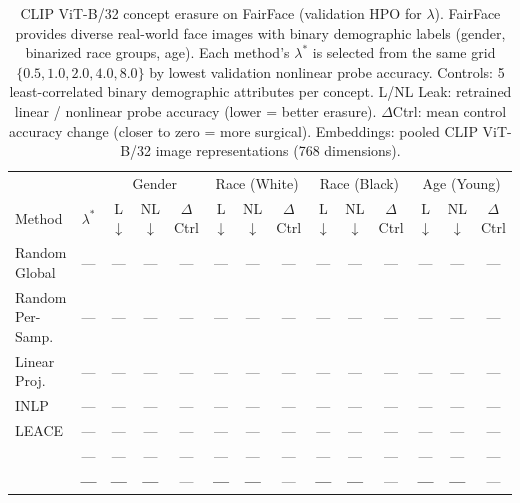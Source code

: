 \begin{table}[t]
\centering
\caption{CLIP ViT-B/32 concept erasure on FairFace (validation HPO for $\lambda$). FairFace provides diverse real-world face images with binary demographic labels (gender, binarized race groups, age). Each method's $\lambda^*$ is selected from the same grid $\{0.5, 1.0, 2.0, 4.0, 8.0\}$ by lowest validation nonlinear probe accuracy. Controls: 5 least-correlated binary demographic attributes per concept. L/NL Leak: retrained linear / nonlinear probe accuracy (lower = better erasure). $\Delta$Ctrl: mean control accuracy change (closer to zero = more surgical). Embeddings: pooled CLIP ViT-B/32 image representations (768 dimensions).}
\label{tab:fairface_clip_fair}
\small
\setlength{\tabcolsep}{3.5pt}
\begin{tabular}{l c|ccc|ccc|ccc|ccc}
\toprule
 & & \multicolumn{3}{c|}{Gender} & \multicolumn{3}{c|}{Race (White)} & \multicolumn{3}{c|}{Race (Black)} & \multicolumn{3}{c}{Age (Young)} \\
Method & $\lambda^*$ & L$\downarrow$ & NL$\downarrow$ & $\Delta$Ctrl & L$\downarrow$ & NL$\downarrow$ & $\Delta$Ctrl & L$\downarrow$ & NL$\downarrow$ & $\Delta$Ctrl & L$\downarrow$ & NL$\downarrow$ & $\Delta$Ctrl \\
\midrule
Random Global    & --- & --- & --- & --- & --- & --- & --- & --- & --- & --- & --- & --- & --- \\
Random Per-Samp. & --- & --- & --- & --- & --- & --- & --- & --- & --- & --- & --- & --- & --- \\
Linear Proj.     & --- & --- & --- & --- & --- & --- & --- & --- & --- & --- & --- & --- & --- \\
INLP             & --- & --- & --- & --- & --- & --- & --- & --- & --- & --- & --- & --- & --- \\
LEACE            & --- & --- & --- & --- & --- & --- & --- & --- & --- & --- & --- & --- & --- \\
\AmbGCE{}      & --- & --- & --- & --- & --- & --- & --- & --- & --- & --- & --- & --- & --- \\
\textbf{\TanGCE{}} & \textbf{---} & \textbf{---} & \textbf{---} & --- & \textbf{---} & \textbf{---} & --- & \textbf{---} & \textbf{---} & --- & \textbf{---} & \textbf{---} & --- \\
\bottomrule
\end{tabular}
\end{table}

